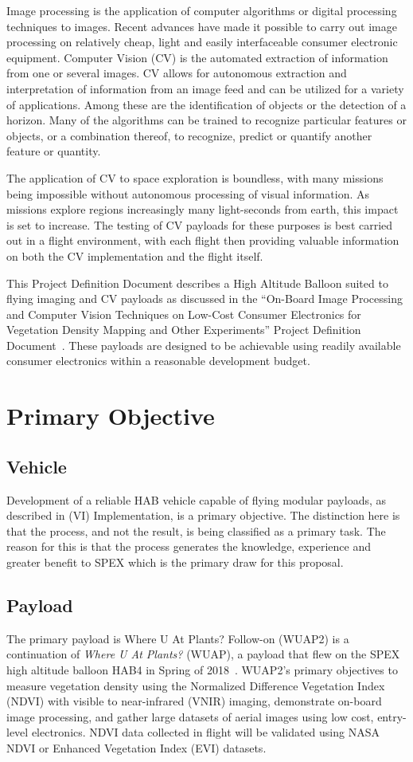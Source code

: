 \documentclass[conference]{IEEEtran} %
\begin{document}
Image processing is the application of computer algorithms or digital processing techniques to images. 
Recent advances have made it possible to carry out image processing on relatively cheap, light and easily interfaceable consumer electronic equipment. 
Computer Vision (CV) is the automated extraction of information from one or several images. 
CV allows for autonomous extraction and interpretation of information from an image feed and can be utilized for a variety of applications. 
Among these are the identification of objects or the detection of a horizon. 
Many of the algorithms can be trained to recognize particular features or objects, or a combination thereof, to recognize, predict or quantify another feature or quantity.

The application of CV to space exploration is boundless, with many missions being impossible without autonomous processing of visual information. 
As missions explore regions increasingly many light-seconds from earth, this impact is set to increase. 
The testing of CV payloads for these purposes is best carried out in a flight environment, with each flight then providing valuable information on both the CV implementation and the flight itself. 

This Project Definition Document describes a High Altitude Balloon suited to flying imaging and CV payloads as discussed in the “On-Board Image Processing and Computer Vision Techniques on Low-Cost Consumer Electronics for Vegetation Density Mapping and Other Experiments” Project Definition Document~\cite{habcvpdd}. These payloads are designed to be achievable using readily available consumer electronics within a reasonable development budget. 

\section{Primary Objective}
\subsection{Vehicle}
Development of a reliable HAB vehicle capable of flying modular payloads, as described in (VI) Implementation, is a primary objective. The distinction here is that the process, and not the result, is being classified as a primary task. The reason for this is that the process generates the knowledge, experience and greater benefit to SPEX which is the primary draw for this proposal.

\subsection{Payload}
The primary payload is Where U At Plants? Follow-on (WUAP2) is a continuation of \textit{Where U At Plants?} (WUAP), a payload that flew on the SPEX high altitude balloon  HAB4 in Spring of 2018~\cite{wuaphab4}. WUAP2’s primary objectives to measure vegetation density using the Normalized Difference Vegetation Index (NDVI) with visible to near-infrared (VNIR) imaging, demonstrate on-board image processing, and gather large datasets of aerial images using low cost, entry-level electronics. NDVI data collected in flight will be validated using NASA NDVI or Enhanced Vegetation Index (EVI) datasets.
\end{document}
